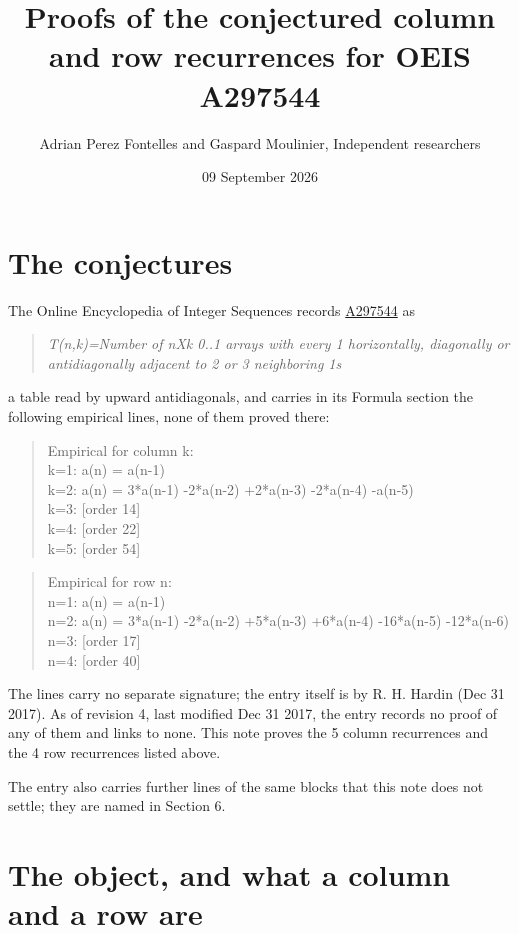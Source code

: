 \documentclass[11pt]{article}
\title{Proofs of the conjectured column and row recurrences for OEIS A297544}
\author{Adrian Perez Fontelles and Gaspard Moulinier, Independent researchers}
\date{09 September 2026}
\theoremstyle{definition}
\begin{document}
\maketitle
\section{The conjectures}

The Online Encyclopedia of Integer Sequences records \href{https://oeis.org/A297544}{A297544} as

\begin{quote}\itshape T(n,k)=Number of nXk 0..1 arrays with every 1 horizontally, diagonally or antidiagonally adjacent to 2 or 3 neighboring 1s\end{quote}

a table read by upward antidiagonals, and carries in its Formula section the following empirical lines, none of them proved there:

\begin{quote}\ttfamily Empirical for column k:\\
k=1: a(n) = a(n-1)\\k=2: a(n) = 3*a(n-1) -2*a(n-2) +2*a(n-3) -2*a(n-4) -a(n-5)\\k=3: [order 14]\\k=4: [order 22]\\k=5: [order 54]\end{quote}

\begin{quote}\ttfamily Empirical for row n:\\
n=1: a(n) = a(n-1)\\n=2: a(n) = 3*a(n-1) -2*a(n-2) +5*a(n-3) +6*a(n-4) -16*a(n-5) -12*a(n-6)\\n=3: [order 17]\\n=4: [order 40]\end{quote}

The lines carry no separate signature; the entry itself is by R. H. Hardin (Dec 31 2017). As of revision 4, last modified Dec 31 2017, the entry records no proof of any of them and links to none. This note proves the 5 column recurrences and the 4 row recurrences listed above.

The entry also carries further lines of the same blocks that this note does not settle; they are named in Section 6.

\section{The object, and what a column and a row are}
\end{document}
